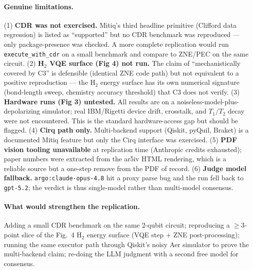 \documentclass[11pt]{article}
\begin{document}
\paragraph{Genuine limitations.} (1) \textbf{CDR was not exercised.} Mitiq's third headline primitive (Clifford data regression) is listed as ``supported'' but no CDR benchmark was reproduced --- only package-presence was checked. A more complete replication would run \texttt{execute\_with\_cdr} on a small benchmark and compare to ZNE/PEC on the same circuit. (2) \textbf{H$_2$ VQE surface (Fig 4) not run.} The claim of ``mechanistically covered by C3'' is defensible (identical ZNE code path) but not equivalent to a positive reproduction --- the H$_2$ energy surface has its own numerical signature (bond-length sweep, chemistry accuracy threshold) that C3 does not verify. (3) \textbf{Hardware runs (Fig 3) untested.} All results are on a noiseless-model-plus-depolarizing simulator; real IBM/Rigetti device drift, crosstalk, and $T_1/T_2$ decay were not encountered. This is the standard hardware-access gap but should be flagged. (4) \textbf{Cirq path only.} Multi-backend support (Qiskit, pyQuil, Braket) is a documented Mitiq feature but only the Cirq interface was exercised. (5) \textbf{PDF vision tooling unavailable} at replication time (Anthropic credits exhausted); paper numbers were extracted from the ar5iv HTML rendering, which is a reliable source but a one-step remove from the PDF of record. (6) \textbf{Judge model fallback.} \texttt{argo:claude-opus-4.8} hit a proxy parse bug and the run fell back to \texttt{gpt-5.2}; the verdict is thus single-model rather than multi-model consensus.

\paragraph{What would strengthen the replication.} Adding a small CDR benchmark on the same 2-qubit circuit; reproducing a $\ge 3$-point slice of the Fig.~4 H$_2$ energy surface (VQE step + ZNE post-processing); running the same executor path through Qiskit's noisy Aer simulator to prove the multi-backend claim; re-doing the LLM judgment with a second free model for consensus.
\end{document}
